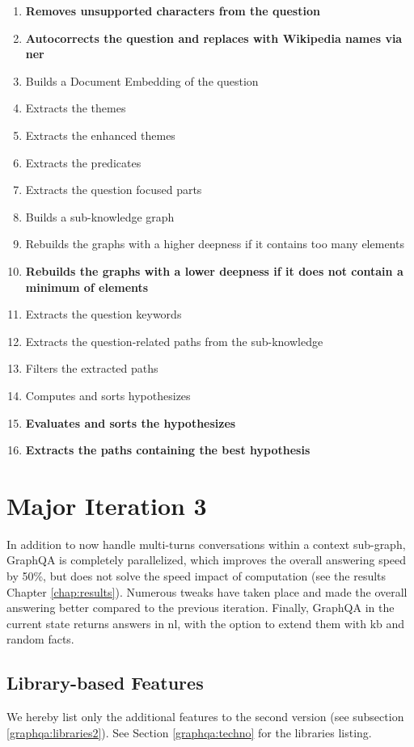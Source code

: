 \begin{enumerate}
    \setlength\itemsep{0em}
    \item \textbf{Removes unsupported characters from the question}
    \item \textbf{Autocorrects the question and replaces with Wikipedia names via \gls{ner}}
    \item Builds a Document Embedding of the question
    \item Extracts the themes
    \item Extracts the enhanced themes
    \item Extracts the predicates
    \item Extracts the question focused parts
    \item Builds a sub-knowledge graph
    \item Rebuilds the graphs with a higher deepness if it contains too many elements
    \item \textbf{Rebuilds the graphs with a lower deepness if it does not contain a minimum of elements}
    \item Extracts the question keywords
    \item Extracts the question-related paths from the sub-knowledge
    \item Filters the extracted paths
    \item Computes and sorts hypothesizes
    \item \textbf{Evaluates and sorts the hypothesizes}
    \item \textbf{Extracts the paths containing the best hypothesis}
\end{enumerate}


\section{Major Iteration 3}
\label{graphqa:graphqa3}
In addition to now handle multi-turns conversations within a context sub-graph, GraphQA is completely parallelized, which improves the overall answering speed by 50\%, but does not solve the speed impact of computation (see the results Chapter \ref{chap:results}). Numerous tweaks have taken place and made the overall answering better compared to the previous iteration. Finally, GraphQA in the current state returns answers in \gls{nl}, with the option to extend them with \gls{kb} and random facts.

\subsection{Library-based Features}
We hereby list only the additional features to the second version (see subsection \ref{graphqa:libraries2}). See Section \ref{graphqa:techno} for the libraries listing.

